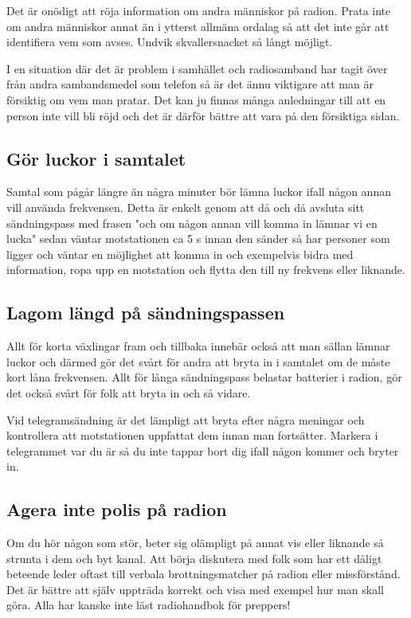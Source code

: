 Det är onödigt att röja information om andra människor på radion. Prata inte om andra människor annat än i ytterst allmäna ordalag så att det inte går att identifiera vem som avses. Undvik skvallersnacket så långt möjligt.

I en situation där det är problem i samhället och radiosamband har tagit över från andra sambandsmedel som telefon så är det ännu viktigare att man är försiktig om vem man pratar. Det kan ju finnas många anledningar till att en person inte vill bli röjd och det är därför bättre att vara på den försiktiga sidan.

\subsection{Gör luckor i samtalet}

Samtal som pågår längre än några minuter bör lämna luckor ifall någon annan vill använda frekvensen. Detta är enkelt genom att då och då avsluta sitt sändningspass med frasen "och om någon annan vill komma in lämnar vi en lucka" sedan väntar motstationen ca 5 s innan den sänder så har personer som ligger och väntar en möjlighet att komma in och exempelvis bidra med information, ropa upp en motstation och flytta den till ny frekvens eller liknande.

\subsection{Lagom längd på sändningspassen}

Allt för korta växlingar fram och tillbaka innebär också att man sällan lämnar luckor och därmed gör det svårt för andra att bryta in i samtalet om de måste kort låna frekvensen. Allt för långa sändningspass belastar batterier i radion, gör det också svårt för folk att bryta in och så vidare.

Vid telegramsändning är det lämpligt att bryta efter några meningar och kontrollera att motstationen uppfattat dem innan man fortsätter. Markera i telegrammet var du är så du inte tappar bort dig ifall någon kommer och bryter in.

\subsection{Agera inte polis på radion}

Om du hör någon som stör, beter sig olämpligt på annat vis eller liknande så strunta i dem och byt kanal. Att börja diskutera  med folk som har ett dåligt beteende leder oftast till verbala brottningsmatcher på radion eller missförstånd. Det är bättre att själv uppträda korrekt och visa med exempel hur man skall göra. Alla har kanske inte läst radiohandbok för preppers!

